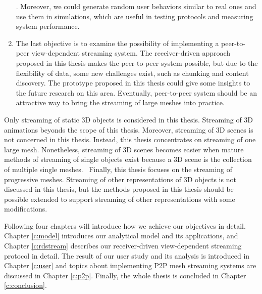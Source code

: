 \documentclass[11pt, a4paper]{report}
\begin{document}
\begin{enumerate}
            \cite {ousterhout85trace}. Moreover, we could generate random user 
            behaviors similar to real ones and use them in simulations, which 
            are useful in testing protocols and measuring system performance.
        \item 
            The last objective is to examine the possibility 
            of implementing a peer-to-peer view-dependent streaming system. 
            The receiver-driven approach proposed in this thesis 
            makes the peer-to-peer system possible, 
            but due to the flexibility of data, some new challenges exist,
            such as chunking and content discovery. 
            The prototype proposed in this thesis could give some insights
            to the future research on this area. 
            Eventually, peer-to-peer system should be an attractive way 
            to bring the streaming of large meshes into practice. 
    \end{enumerate}

    Only streaming of static 3D objects is considered in this thesis. 
    Streaming of 3D animations beyonds the scope of this thesis. 
    Moreover, streaming of 3D scenes is not concerned in this thesis.
    Instead, this thesis concentrates on streaming of one large mesh.
    Nonetheless, streaming of 3D scenes becomes easier when mature methods
    of streaming of single objects exist because a 3D scene is the collection
    of multiple single meshes. 
    Finally, this thesis focuses on the streaming of progressive meshes. 
    Streaming of other representations of 3D objects is not discussed in this thesis,
    but the methods proposed in this thesis should be possible
    extended to support streaming of other representations with some modifications.

    Following four chapters will introduce how we achieve our objectives in detail.
    Chapter \ref{c:model} introduces our analytical model and its applications, and
    Chapter \ref{c:rdstream} describes our receiver-driven view-dependent streaming
    protocol in detail. The result of our user study and its analysis is introduced
    in Chapter \ref{c:user} and topics about implementing P2P mesh streaming systems
    are discussed in Chapter \ref{c:p2p}. Finally, the whole thesis is concluded in
    Chapter \ref{c:conclusion}.




\end{document}
